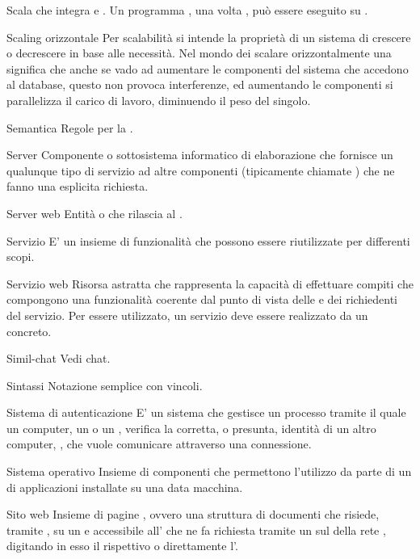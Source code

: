 
\elemento
{Scala}
{ che integra  e . Un programma , una volta , può essere eseguito su .}

\elemento
{Scaling orizzontale}
{Per scalabilità si intende la proprietà di un sistema di crescere o decrescere in base alle necessità. Nel mondo dei  scalare orizzontalmente una  significa che anche se vado ad aumentare le componenti del sistema che accedono al database, questo non provoca interferenze, ed aumentando le componenti si parallelizza il carico di lavoro, diminuendo il peso del singolo.
}

\elemento
{Semantica}
{Regole per la .}

\elemento
{Server}
{Componente o sottosistema informatico di elaborazione che fornisce un qualunque tipo di servizio ad altre componenti (tipicamente chiamate ) che ne fanno una esplicita richiesta.}

\elemento
{Server web}
{Entità  o  che rilascia  al .}

\elemento
{Servizio}
{E' un insieme di funzionalità  che possono essere riutilizzate per differenti scopi.}

\elemento
{Servizio web}
{Risorsa astratta che rappresenta la capacità di effettuare compiti che compongono una funzionalità coerente dal punto di vista delle  e dei richiedenti del servizio. Per essere utilizzato, un servizio deve essere realizzato da un  concreto.}

\elemento
{Simil-chat}
{Vedi chat.}

\elemento
{Sintassi}
{Notazione semplice con vincoli.}

\elemento
{Sistema di autenticazione}
{E' un sistema che gestisce un processo tramite il quale un computer, un  o un , verifica la corretta, o presunta, identità di un altro computer, , che vuole comunicare attraverso una connessione.}

\elemento
{Sistema operativo}
{Insieme di componenti  che permettono l'utilizzo da parte di un  di applicazioni installate su una data macchina.}

\elemento
{Sito web}
{Insieme di pagine , ovvero una struttura  di documenti che risiede, tramite , su un  e accessibile all' che ne fa richiesta tramite un  sul  della rete , digitando in esso il rispettivo  o direttamente l'.}

